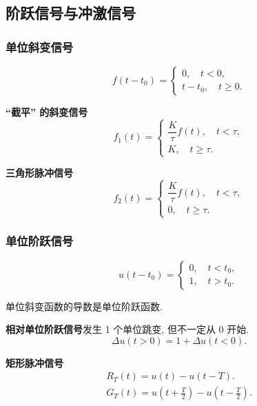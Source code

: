 \subsection{阶跃信号与冲激信号}
\subsubsection{单位斜变信号}

\rmg
\begin{equation}
    f(t-t_0)=\begin{cases}
        0,\quad t<0, \\
        t-t_0,\quad t\geq 0.
    \end{cases}
\end{equation}

\textbf{``截平'' 的斜变信号}
\begin{equation}
    f_1(t)=\begin{cases}
        \dfrac{K}{\tau}f(t),\quad t<\tau, \\
        K,\quad t\geq\tau.
    \end{cases}
\end{equation}

\textbf{三角形脉冲信号}
\begin{equation}
    f_2(t)=\begin{cases}
        \dfrac{K}{\tau}f(t),\quad t<\tau, \\
        0,\quad t\geq\tau.
    \end{cases}
\end{equation}

\subsubsection{单位阶跃信号}

\rmg
\begin{equation}
    u(t-t_0)=\begin{cases}
        0,\quad t<t_0, \\
        1,\quad t>t_0.
    \end{cases}
\end{equation}

单位斜变函数的导数是单位阶跃函数.

\textbf{相对单位阶跃信号}\quad 发生 1 个单位跳变, 但不一定从 0 开始.
\begin{equation}
    \Delta u(t>0)=1+\Delta u(t<0).
\end{equation}

\textbf{矩形脉冲信号}
\begin{gather}
    R_T(t)=u(t)-u(t-T). \\
    G_T(t)=u\left(t+\frac{T}{2}\right)-u\left(t-\frac{T}{2}\right).
\end{gather}

